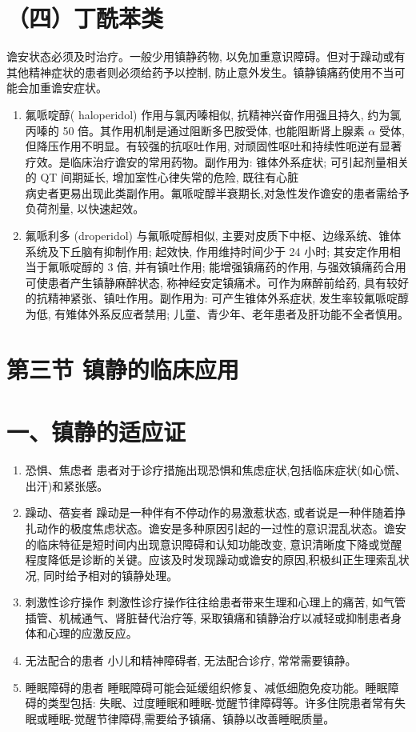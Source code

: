\documentclass[10pt]{article}
\begin{document}
\section*{（四）丁酰苯类}
谵安状态必须及时治疗。一般少用镇静药物, 以免加重意识障碍。但对于躁动或有其他精神症状的患者则必须给药予以控制, 防止意外发生。镇静镇痛药使用不当可能会加重谵安症状。

\begin{enumerate}
  \item 氟哌啶醇( haloperidol) 作用与氯丙嗪相似, 抗精神兴奋作用强且持久, 约为氯丙嗪的 50 倍。其作用机制是通过阻断多巴胺受体, 也能阻断肾上腺素 $\alpha$ 受体, 但降压作用不明显。有较强的抗呕吐作用, 对顽固性呕吐和持续性呃逆有显著疗效。是临床治疗谵安的常用药物。副作用为: 锥体外系症状; 可引起剂量相关的 QT 间期延长, 增加室性心律失常的危险, 既往有心脏\\
病史者更易出现此类副作用。氟哌啶醇半衰期长,对急性发作谵安的患者需给予负荷剂量, 以快速起效。

  \item 氟哌利多 (droperidol) 与氟哌啶醇相似, 主要对皮质下中枢、边缘系统、锥体系统及下丘脑有抑制作用; 起效快, 作用维持时间少于 24 小时; 其安定作用相当于氟哌啶醇的 3 倍, 并有镇吐作用; 能增强镇痛药的作用, 与强效镇痛药合用可使患者产生镇静麻醉状态, 称神经安定镇痛术。可作为麻醉前给药, 具有较好的抗精神紧张、镇吐作用。副作用为: 可产生锥体外系症状, 发生率较氟哌啶醇为低, 有雉体外系反应者禁用; 儿童、青少年、老年患者及肝功能不全者慎用。

\end{enumerate}

\section*{第三节 镇静的临床应用}
\section*{一、镇静的适应证}
\begin{enumerate}
  \item 恐惧、焦虑者 患者对于诊疗措施出现恐惧和焦虑症状,包括临床症状(如心慌、出汗)和紧张感。

  \item 躁动、蓓妄者 躁动是一种伴有不停动作的易激惹状态, 或者说是一种伴随着挣扎动作的极度焦虑状态。谵安是多种原因引起的一过性的意识混乱状态。谵安的临床特征是短时间内出现意识障碍和认知功能改变, 意识清晰度下降或觉醒程度降低是诊断的关键。应该及时发现躁动或谵安的原因,积极纠正生理索乱状况, 同时给予相对的镇静处理。

  \item 刺激性诊疗操作 刺激性诊疗操作往往给患者带来生理和心理上的痛苦, 如气管插管、机械通气、肾脏替代治疗等, 采取镇痛和镇静治疗以减轻或抑制患者身体和心理的应激反应。

  \item 无法配合的患者 小儿和精神障碍者, 无法配合诊疗, 常常需要镇静。

  \item 睡眠障碍的患者 睡眠障碍可能会延缓组织修复、减低细胞免疫功能。睡眠障碍的类型包括: 失眠、过度睡眠和睡眠-觉醒节律障碍等。许多住院患者常有失眠或睡眠-觉醒节律障碍,需要给予镇痛、镇静以改善睡眠质量。

\end{enumerate}
\end{document}
